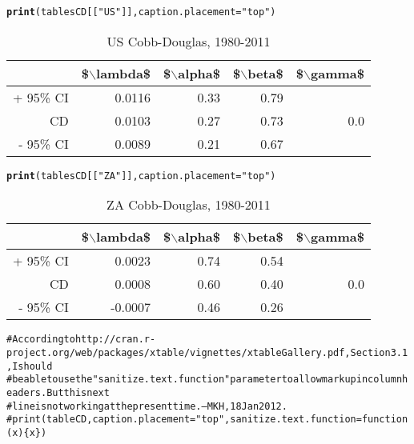 \documentclass[preprint,authoryear,12pt]{elsarticle}\usepackage{graphicx, color}
\makeatletter
\newcommand{\hlfunctioncall}[1]{\textcolor[rgb]{0.501960784313725,0,0.329411764705882}{\textbf{#1}}}%
\newcommand{\hlstring}[1]{\textcolor[rgb]{0.6,0.6,1}{#1}}%
\newcommand{\hlcomment}[1]{\textcolor[rgb]{0.180392156862745,0.6,0.341176470588235}{#1}}%
\newenvironment{kframe}{%
 \def\at@end@of@kframe{}%
 \ifinner\ifhmode%
  \def\at@end@of@kframe{\end{minipage}}%
  \begin{minipage}{\columnwidth}%
 \fi\fi%
 \def\FrameCommand##1{\hskip\@totalleftmargin \hskip-\fboxsep
 \colorbox{shadecolor}{##1}\hskip-\fboxsep
     \hskip-\linewidth \hskip-\@totalleftmargin \hskip\columnwidth}%
 \MakeFramed {\advance\hsize-\width
   \@totalleftmargin\z@ \linewidth\hsize
   \@setminipage}}%
 {\par\unskip\endMakeFramed%
 \at@end@of@kframe}
\makeatother
\begin{document}
\begin{kframe}
\begin{alltt}
\hlfunctioncall{print}(tablesCD[[\hlstring{"US"}]], caption.placement=\hlstring{"top"})
\end{alltt}
\end{kframe}%
\begin{table}[ht]
\begin{center}
\caption{US Cobb-Douglas, 1980-2011}
\begin{tabular}{rrrrr}
  \hline
 & \$$\backslash$lambda\$ & \$$\backslash$alpha\$ & \$$\backslash$beta\$ & \$$\backslash$gamma\$ \\ 
  \hline
+ 95\% CI & 0.0116 & 0.33 & 0.79 &  \\ 
  CD & 0.0103 & 0.27 & 0.73 & 0.0 \\ 
  - 95\% CI & 0.0089 & 0.21 & 0.67 &  \\ 
   \hline
\end{tabular}
\end{center}
\end{table}
\begin{kframe}\begin{alltt}
\hlfunctioncall{print}(tablesCD[[\hlstring{"ZA"}]], caption.placement=\hlstring{"top"})
\end{alltt}
\end{kframe}%
\begin{table}[ht]
\begin{center}
\caption{ZA Cobb-Douglas, 1980-2011}
\begin{tabular}{rrrrr}
  \hline
 & \$$\backslash$lambda\$ & \$$\backslash$alpha\$ & \$$\backslash$beta\$ & \$$\backslash$gamma\$ \\ 
  \hline
+ 95\% CI & 0.0023 & 0.74 & 0.54 &  \\ 
  CD & 0.0008 & 0.60 & 0.40 & 0.0 \\ 
  - 95\% CI & -0.0007 & 0.46 & 0.26 &  \\ 
   \hline
\end{tabular}
\end{center}
\end{table}
\begin{kframe}\begin{alltt}
\hlcomment{# According to http://cran.r-project.org/web/packages/xtable/vignettes/xtableGallery.pdf, Section 3.1, I should }
\hlcomment{# be able to use the "sanitize.text.function" parameter to allow markup in column headers. But this next}
\hlcomment{# line is not working at the present time. --MKH, 18 Jan 2012.}
\hlcomment{# print(tableCD, caption.placement="top", sanitize.text.function = function(x)\{x\})}
\end{alltt}
\end{kframe}
\end{document}
